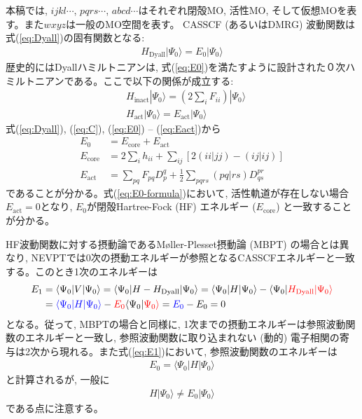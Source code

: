 \documentclass[11pt,pra,aps]{revtex4}
\newcommand{\red}[1]{\textcolor{red}{#1}}
\newcommand{\blue}[1]{\textcolor{blue}{#1}}
\begin{document}
%
本稿では, $ijkl\cdots$, $pqrs\cdots$, $abcd\cdots$はそれぞれ閉殻MO, 活性MO, そして仮想MOを表す。また$wxyz$は一般のMO空間を表す。
%
%
CASSCF (あるいはDMRG) 波動関数は式(\ref{eq:Dyall})の固有関数となる:
%
\begin{align}
  H_\text{Dyall}|\Psi_0\rangle = E_0|\Psi_0\rangle \label{eq:E0}
\end{align}
%
歴史的にはDyallハミルトニアンは, 式(\ref{eq:E0})を満たすように設計された０次ハミルトニアンである。ここで以下の関係が成立する:
%
\begin{align}
  & H_\text{inact}|\Psi_0\rangle = \left(2\sum_i F_{ii}\right)|\Psi_0\rangle \label{eq:Einact}\\
  & H_\text{act}|\Psi_0\rangle = E_\text{act}|\Psi_0\rangle \label{eq:Eact}
\end{align}
%
式(\ref{eq:Dyall}), (\ref{eq:C}), (\ref{eq:E0}) -- (\ref{eq:Eact})から
%
\begin{align}
  E_0 &= E_\text{core} + E_\text{act} \label{eq:E0-formula} \\
  E_\text{core} &= 2\sum_i h_{ii} + \sum_{ij} [2(ii|jj)-(ij|ij)] \label{eq:E0-formula-Ecore} \\
  E_\text{act} &= \sum_{pq} F_{pq} D_p^q + \frac{1}{2}\sum_{pqrs} (pq|rs) D^{pr}_{qs}\label{eq:E0-formula-Eact}  
\end{align}
%
であることが分かる。式(\ref{eq:E0-formula})において, 活性軌道が存在しない場合$E_\text{act}=0$となり, $E_0$が閉殻Hartree-Fock (HF) エネルギー ($E_\text{core}$) と一致することが分かる。

HF波動関数に対する摂動論であるM\o ller-Plesset摂動論 (MBPT)\cite{MP2} の場合とは異なり, NEVPTでは0次の摂動エネルギーが参照となるCASSCFエネルギーと一致する。このとき1次のエネルギーは
\begin{align}
  E_1 &= \langle\Psi_0|V|\Psi_0\rangle=\langle\Psi_0|H-H_\text{Dyall}|\Psi_0\rangle=\langle\Psi_0|H|\Psi_0\rangle-\langle\Psi_0|\red{H_\text{Dyall}|\Psi_0\rangle} \nonumber \\
      &= \blue{\langle\Psi_0|H|\Psi_0\rangle}-\red{E_0}\langle\Psi_0|\red{\Psi_0\rangle} = \blue{E_0} - E_0 = 0 \label{eq:E1}
\end{align}
となる。従って, MBPTの場合と同様に, 1次までの摂動エネルギーは参照波動関数のエネルギーと一致し, 参照波動関数に取り込まれない (動的) 電子相関の寄与は2次から現れる。また式(\ref{eq:E1})において, 参照波動関数のエネルギーは
\begin{align}
  E_0=\langle\Psi_0|H|\Psi_0\rangle
\end{align}
と計算されるが, 一般に
\begin{align}
  H|\Psi_0\rangle \neq E_0|\Psi_0\rangle
\end{align}
である点に注意する。
\end{document}
